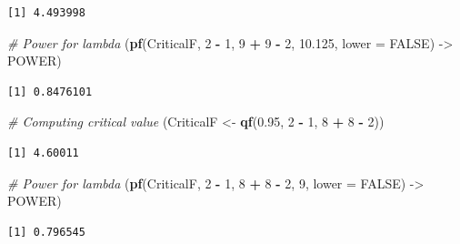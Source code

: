\documentclass[
]{article}
\newenvironment{Shaded}{\begin{snugshade}}{\end{snugshade}}
\newcommand{\AttributeTok}[1]{\textcolor[rgb]{0.13,0.29,0.53}{#1}}
\newcommand{\CommentTok}[1]{\textcolor[rgb]{0.56,0.35,0.01}{\textit{#1}}}
\newcommand{\ConstantTok}[1]{\textcolor[rgb]{0.56,0.35,0.01}{#1}}
\newcommand{\DecValTok}[1]{\textcolor[rgb]{0.00,0.00,0.81}{#1}}
\newcommand{\FloatTok}[1]{\textcolor[rgb]{0.00,0.00,0.81}{#1}}
\newcommand{\FunctionTok}[1]{\textcolor[rgb]{0.13,0.29,0.53}{\textbf{#1}}}
\newcommand{\NormalTok}[1]{#1}
\newcommand{\OtherTok}[1]{\textcolor[rgb]{0.56,0.35,0.01}{#1}}
\newcommand{\SpecialCharTok}[1]{\textcolor[rgb]{0.81,0.36,0.00}{\textbf{#1}}}
\begin{document}
\begin{verbatim}
[1] 4.493998
\end{verbatim}

\begin{Shaded}
\begin{Highlighting}[]
\CommentTok{\# Power for lambda}
\NormalTok{(}\FunctionTok{pf}\NormalTok{(CriticalF, }\DecValTok{2} \SpecialCharTok{{-}} \DecValTok{1}\NormalTok{, }\DecValTok{9} \SpecialCharTok{+} \DecValTok{9} \SpecialCharTok{{-}} \DecValTok{2}\NormalTok{, }\FloatTok{10.125}\NormalTok{, }\AttributeTok{lower =} \ConstantTok{FALSE}\NormalTok{) }\OtherTok{{-}\textgreater{}}\NormalTok{ POWER)}
\end{Highlighting}
\end{Shaded}

\begin{verbatim}
[1] 0.8476101
\end{verbatim}

\begin{Shaded}
\begin{Highlighting}[]
\CommentTok{\# Computing critical value}
\NormalTok{(CriticalF }\OtherTok{\textless{}{-}} \FunctionTok{qf}\NormalTok{(}\FloatTok{0.95}\NormalTok{, }\DecValTok{2} \SpecialCharTok{{-}} \DecValTok{1}\NormalTok{, }\DecValTok{8} \SpecialCharTok{+} \DecValTok{8} \SpecialCharTok{{-}} \DecValTok{2}\NormalTok{))}
\end{Highlighting}
\end{Shaded}

\begin{verbatim}
[1] 4.60011
\end{verbatim}

\begin{Shaded}
\begin{Highlighting}[]
\CommentTok{\# Power for lambda}
\NormalTok{(}\FunctionTok{pf}\NormalTok{(CriticalF, }\DecValTok{2} \SpecialCharTok{{-}} \DecValTok{1}\NormalTok{, }\DecValTok{8} \SpecialCharTok{+} \DecValTok{8} \SpecialCharTok{{-}} \DecValTok{2}\NormalTok{, }\DecValTok{9}\NormalTok{, }\AttributeTok{lower =} \ConstantTok{FALSE}\NormalTok{) }\OtherTok{{-}\textgreater{}}\NormalTok{ POWER)}
\end{Highlighting}
\end{Shaded}

\begin{verbatim}
[1] 0.796545
\end{verbatim}
\end{document}
